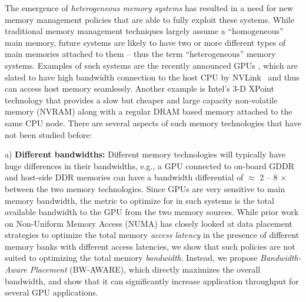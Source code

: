 %
%
%
The emergence of {\it heterogeneous memory systems} has resulted in a need for
new memory management policies that are able to fully exploit these systems.
While traditional memory management techniques largely assume a ``homogeneous''
main memory, future systems are likely to have two or more different types of
main memories attached to them -- thus the term ``heterogeneous'' memory
systems. Examples of such systems are the recently announced GPUs
 \cite{pascal}, which are slated to have high bandwidth connection to the host
CPU by NVLink~\cite{NVLINK} and thus can access host memory seamlessly.  Another
example is Intel's 3-D XPoint~\cite{xpoint} technology that provides a slow but
cheaper and large capacity non-volatile memory (NVRAM) along with a regular DRAM
based memory attached to the same CPU node.  There are several aspects of such
memory technologies that have not been studied before:

a) \textbf{Different bandwidths:}
Different memory technologies will typically have huge differences in their
bandwidths, e.g., a GPU connected to on-board GDDR and host-side DDR memories
can have a bandwidth differential of $\approx$ 2 -- 8 $\times$ between the two
memory technologies. Since GPUs are very sensitive to main memory bandwidth, the
metric to optimize for in such systems is the total available bandwidth to the
GPU from the two memory sources. While prior work on Non-Uniform Memory Access
(NUMA) has closely looked at data placement strategies to optimize the total
memory {\it access latency} in the presence of different memory banks with
different access latencies, we show that such policies are not suited to
optimizing the total memory {\it bandwidth}. Instead, we propose {\it
Bandwidth-Aware Placement} (BW-AWARE), which directly maximizes the overall
bandwidth, and show that it can significantly increase application throughput
for several GPU applications.

